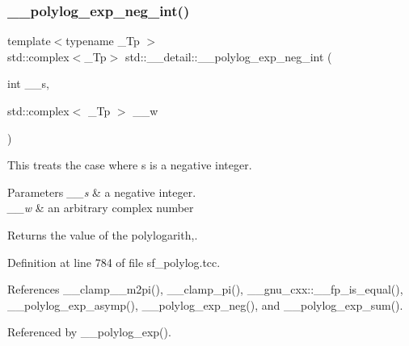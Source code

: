 \subsubsection{\texorpdfstring{\+\_\+\+\_\+polylog\+\_\+exp\+\_\+neg\+\_\+int()}{\_\_polylog\_exp\_neg\_int()}\hspace{0.1cm}{\footnotesize\ttfamily [1/2]}}
{\footnotesize\ttfamily template$<$typename \+\_\+\+Tp $>$ \\
std\+::complex$<$\+\_\+\+Tp$>$ std\+::\+\_\+\+\_\+detail\+::\+\_\+\+\_\+polylog\+\_\+exp\+\_\+neg\+\_\+int (\begin{DoxyParamCaption}\item[{int}]{\+\_\+\+\_\+s,  }\item[{std\+::complex$<$ \+\_\+\+Tp $>$}]{\+\_\+\+\_\+w }\end{DoxyParamCaption})}

This treats the case where s is a negative integer.


\begin{DoxyParams}{Parameters}
{\em \+\_\+\+\_\+s} & a negative integer. \\
\hline
{\em \+\_\+\+\_\+w} & an arbitrary complex number \\
\hline
\end{DoxyParams}
\begin{DoxyReturn}{Returns}
the value of the polylogarith,. 
\end{DoxyReturn}


Definition at line 784 of file sf\+\_\+polylog.\+tcc.



References \+\_\+\+\_\+clamp\+\_\+\_\+m2pi(), \+\_\+\+\_\+clamp\+\_\+pi(), \+\_\+\+\_\+gnu\+\_\+cxx\+::\+\_\+\+\_\+fp\+\_\+is\+\_\+equal(), \+\_\+\+\_\+polylog\+\_\+exp\+\_\+asymp(), \+\_\+\+\_\+polylog\+\_\+exp\+\_\+neg(), and \+\_\+\+\_\+polylog\+\_\+exp\+\_\+sum().



Referenced by \+\_\+\+\_\+polylog\+\_\+exp().

\mbox{\label{namespacestd_1_1____detail_a7a186c84c1673a2beabba25c91119c66}} 

